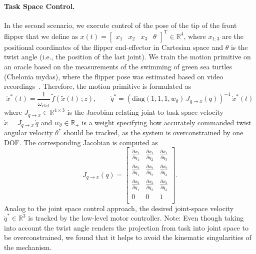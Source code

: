 \paragraph{Task Space Control.} In the second scenario, we execute control of the pose of the tip of the front flipper that we define as $x(t) = \begin{bmatrix}
    x_1 & x_2 & x_3 & \theta
\end{bmatrix}^\mathrm{T} \in \mathbb{R}^4$, where $x_{1:3}$ are the positional coordinates of the flipper end-effector in Cartesian space and $\theta$ is the twist angle (i.e., the position of the last joint).
We train the motion primitive on an oracle based on the measurements of the swimming of green sea turtles (Chelonia mydas), where the flipper pose was estimated based on video recordings~\citep{van2022new}. Therefore, the motion primitive is formulated as
\begin{equation}
    \dot{x}^*(t) = \frac{1}{\omega_\mathrm{ctrl}} \, \tilde{f}(\tilde{x}(t) \, ; z),
    \qquad
    \dot{q}^* = \left ( \mathrm{diag}(1,1,1,w_\theta) \, J_{q \rightarrow x}(q) \right )^{-1} \, \dot{x}^*(t)
\end{equation}
where $J_{q \rightarrow x} \in \mathbb{R}^{4 \times 3}$ is the Jacobian relating joint to task space velocity $\dot{x} = J_{q \rightarrow x} \, \dot{q}$ and $w_\theta \in \mathbb{R}_+$ is a weight specifying how accurately commanded twist angular velocity $\theta^*$ should be tracked, as the system is overconstrained by one \gls{DOF}. The corresponding Jacobian is computed as
\begin{equation}
    J_{q \rightarrow x}(q) = \begin{bmatrix}
        \frac{\partial x_1}{\partial q_1} & \frac{\partial x_1}{\partial q_2} & \frac{\partial x_1}{\partial q_3}\\
        \frac{\partial x_2}{\partial q_1} & \frac{\partial x_2}{\partial q_2} & \frac{\partial x_2}{\partial q_3}\\
        \frac{\partial x_3}{\partial q_1} & \frac{\partial x_3}{\partial q_2} & \frac{\partial x_3}{\partial q_3}\\
        0 & 0 & 1\\
    \end{bmatrix}.
\end{equation}
Analog to the joint space control approach, the desired joint-space velocity $\dot{q}^* \in \mathbb{R}^3$ is tracked by the low-level motor controller.
% 
Note: Even though taking into account the twist angle renders the projection from task into joint space to be overconstrained, we found that it helps to avoid the kinematic singularities of the mechanism.
